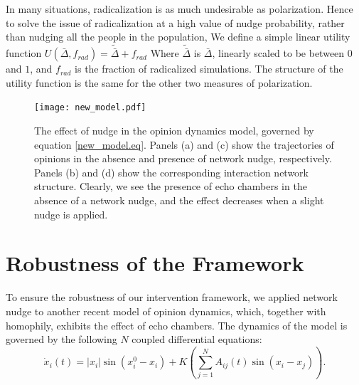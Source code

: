 \documentclass[%
 reprint,
superscriptaddress,
 amsmath,amssymb,
 aps,
 pre,
]{revtex4-1}
\begin{document}
\par
In many situations, radicalization is as much undesirable as polarization. Hence to solve the issue of radicalization at a high value of nudge probability, rather than nudging all the people in the population,  We define a simple linear utility function $U(\bar \Delta, f_{rad}) = \tilde{\bar \Delta} + f_{rad}$
Where $\tilde{\bar \Delta}$ is $\bar \Delta$, linearly scaled to be between $0$ and $1$, and $f_{rad}$ is the fraction of radicalized
simulations. The structure of the utility function is the same for the other two measures of polarization. 

\begin{figure}[H]
\texttt{[image: new\_model.pdf]}
    
    \caption{The effect of nudge in the opinion dynamics model, governed by equation \ref{new_model.eq}. Panels (a) and (c) show the trajectories of opinions in the absence and presence of network nudge, respectively. Panels (b) and (d) show the corresponding interaction network structure. Clearly, we see the presence of echo chambers in the absence of a network nudge, and the effect decreases when a slight nudge is applied.}
    \label{fig:new_model}
\end{figure}
\section{Robustness of the Framework}
To ensure the robustness of our intervention framework, we applied network nudge to another recent model \cite{modeling-explosive-opinion-depolarization-in-interdependent-topics} of opinion dynamics, which, together with homophily, exhibits the effect of echo chambers. The dynamics of the model is governed by the following $N$ coupled differential equations:
\begin{equation}
    \label{new_model.eq}
    \dot{x}_i(t)= |x_i|\sin{(x_i^0- x_i)} + K \left(\sum^{N}_{j=1} A_{ij} (t)  \sin{(x_i - x_j)}\right).
\end{equation}
\end{document}
